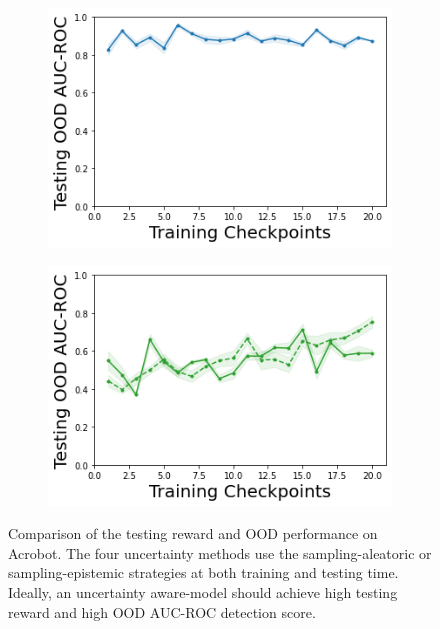 \begin{figure}
\begin{subfigure}{.245\textwidth}
        \includegraphics[width=\textwidth]{sections/011_icml2022/resources/DKL-AcrobotOOD-v0-AUC-ROC-epistemic_-testing-strategy.png}
    \end{subfigure}
    \begin{subfigure}{.245\textwidth}
        \includegraphics[width=\textwidth]{sections/011_icml2022/resources/PostNet-AcrobotOOD-v0-AUC-ROC-epistemic_-testing-strategy.png}
    \end{subfigure}
    \caption{Comparison of the testing reward and OOD performance on Acrobot. The four uncertainty methods use the sampling-aleatoric or sampling-epistemic strategies at both training and testing time. Ideally, an uncertainty aware-model should achieve high testing reward and high OOD AUC-ROC detection score.}
    \label{fig:strategy-testing-performance-acrobot}
\end{figure}